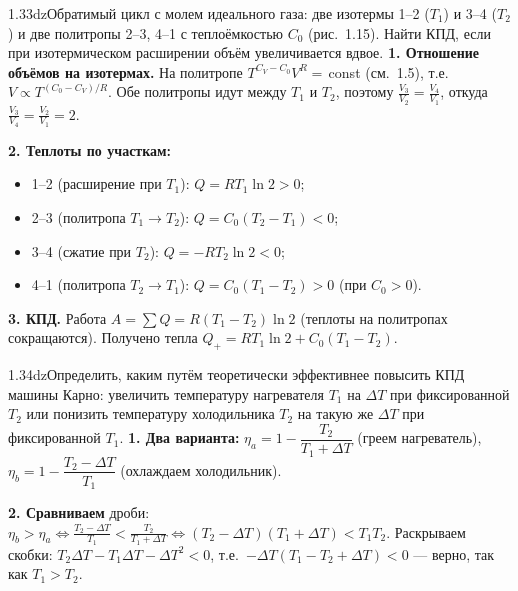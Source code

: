 \begin{problem}{1.33}{dz}{Обратимый цикл с молем идеального газа: две изотермы 1--2 ($T_1$) и 3--4 ($T_2$) и две политропы 2--3, 4--1 с теплоёмкостью $C_0$ (рис.~1.15).
Найти КПД, если при изотермическом расширении объём увеличивается вдвое.}
\textbf{1. Отношение объёмов на изотермах.} На политропе $T^{C_V-C_0}V^R=$\,const (см.\ 1.5), т.е.\ $V\propto T^{(C_0-C_V)/R}$.
Обе политропы идут между $T_1$ и $T_2$, поэтому $\frac{V_3}{V_2}=\frac{V_4}{V_1}$, откуда $\frac{V_3}{V_4}=\frac{V_2}{V_1}=2$.

\textbf{2. Теплоты по участкам:}
\begin{itemize}
\item 1--2 (расширение при $T_1$): $Q=RT_1\ln2>0$;
\item 2--3 (политропа $T_1\to T_2$): $Q=C_0(T_2-T_1)<0$;
\item 3--4 (сжатие при $T_2$): $Q=-RT_2\ln2<0$;
\item 4--1 (политропа $T_2\to T_1$): $Q=C_0(T_1-T_2)>0$ (при $C_0>0$).
\end{itemize}

\textbf{3. КПД.} Работа $A=\sum Q=R(T_1-T_2)\ln2$ (теплоты на политропах сокращаются). Получено тепла $Q_+=RT_1\ln2+C_0(T_1-T_2)$.
\end{problem}

\begin{problem}{1.34}{dz}{Определить, каким путём теоретически эффективнее повысить КПД машины Карно: увеличить температуру нагревателя $T_1$ на $\Delta T$ при
фиксированной $T_2$ или понизить температуру холодильника $T_2$ на такую же $\Delta T$ при фиксированной $T_1$.}
\textbf{1. Два варианта:} $\eta_a=1-\dfrac{T_2}{T_1+\Delta T}$ (греем нагреватель), $\eta_b=1-\dfrac{T_2-\Delta T}{T_1}$ (охлаждаем холодильник).

\textbf{2. Сравниваем} дроби: $\eta_b>\eta_a\iff\frac{T_2-\Delta T}{T_1}<\frac{T_2}{T_1+\Delta T}\iff(T_2-\Delta T)(T_1+\Delta T)<T_1T_2$.
Раскрываем скобки: $T_2\Delta T-T_1\Delta T-\Delta T^2<0$, т.е.\ $-\Delta T(T_1-T_2+\Delta T)<0$ — верно, так как $T_1>T_2$.
\end{problem}

